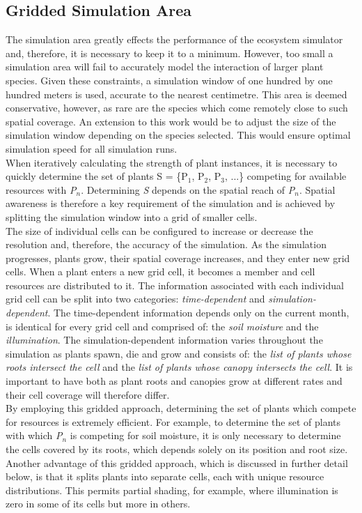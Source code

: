 \subsection{Gridded Simulation Area}

The simulation area greatly effects the performance of the ecosystem simulator and, therefore, it is necessary to keep it to a minimum. However, too small a simulation area will fail to accurately model the interaction of larger plant species. Given these constraints, a simulation window of one hundred by one hundred meters is used, accurate to the nearest centimetre. This area is deemed conservative, however, as rare are the species which come remotely close to such spatial coverage. An extension to this work would be to adjust the size of the simulation window depending on the  species selected. This would ensure optimal simulation speed for all simulation runs. \\

When iteratively calculating the strength of plant instances, it is necessary to quickly determine the set of plants S = \{P$_{1}$, P$_{2}$, P$_{3}$, ...\} competing for available resources with \textit{P$_{n}$}. Determining \textit{S} depends on the spatial reach of \textit{P$_{n}$}. Spatial awareness is therefore a key requirement of the simulation and is achieved by splitting the simulation window into a grid of smaller cells. \\

The size of individual cells can be configured to increase or decrease the resolution and, therefore, the accuracy of the simulation. As the simulation progresses, plants grow, their spatial coverage increases, and they enter new grid cells. When a plant enters a new grid cell, it becomes a member and cell resources are distributed to it. The information associated with each individual grid cell can be split into two categories: \textit{time-dependent} and \textit{simulation-dependent}. The time-dependent information depends only on the current month, is identical for every grid cell and comprised of: the \textit{soil moisture} and the \textit{illumination}. The simulation-dependent information varies throughout the simulation as plants spawn, die and grow and consists of: the \textit{list of plants whose roots intersect the cell} and the \textit{list of plants whose canopy intersects the cell}. It is important to have both as plant roots and canopies grow at different rates and their cell coverage will therefore differ. \\
By employing this gridded approach, determining the set of plants which compete for resources is extremely efficient. For example, to determine the set of plants with which \textit{P$_{n}$} is competing for soil moisture, it is only necessary to determine the cells covered by its roots, which depends solely on its position and root size.\\
Another advantage of this gridded approach, which is discussed in further detail below, is that it splits plants into separate cells, each with unique resource distributions. This permits partial shading, for example, where illumination is zero in some of its cells but more in others. \\

